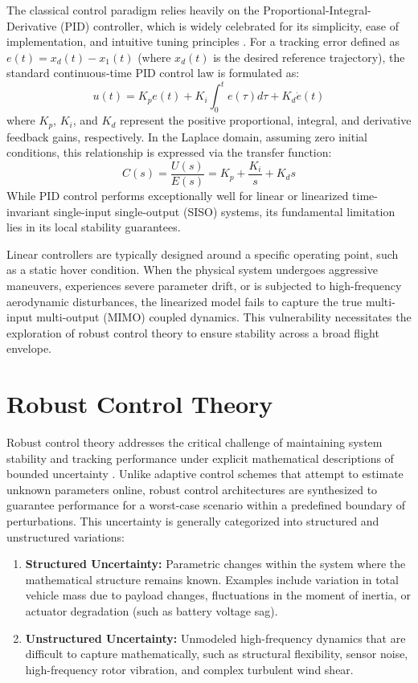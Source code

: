 The classical control paradigm relies heavily on the Proportional-Integral-Derivative (PID) controller, which is widely celebrated for its simplicity, ease of implementation, and intuitive tuning principles \cite{ref_1, ref_28}. For a tracking error defined as $e(t) = x_d(t) - x_1(t)$ (where $x_d(t)$ is the desired reference trajectory), the standard continuous-time PID control law is formulated as:
\begin{equation}
u(t) = K_p e(t) + K_i \int_{0}^{t} e(\tau) d\tau + K_d \dot{e}(t)
\end{equation}
where $K_p$, $K_i$, and $K_d$ represent the positive proportional, integral, and derivative feedback gains, respectively. In the Laplace domain, assuming zero initial conditions, this relationship is expressed via the transfer function:
\begin{equation}
C(s) = \frac{U(s)}{E(s)} = K_p + \frac{K_i}{s} + K_d s
\end{equation}
While PID control performs exceptionally well for linear or linearized time-invariant single-input single-output (SISO) systems, its fundamental limitation lies in its local stability guarantees. 

Linear controllers are typically designed around a specific operating point, such as a static hover condition. When the physical system undergoes aggressive maneuvers, experiences severe parameter drift, or is subjected to high-frequency aerodynamic disturbances, the linearized model fails to capture the true multi-input multi-output (MIMO) coupled dynamics. This vulnerability necessitates the exploration of robust control theory to ensure stability across a broad flight envelope.

\section{Robust Control Theory}
Robust control theory addresses the critical challenge of maintaining system stability and tracking performance under explicit mathematical descriptions of bounded uncertainty \cite{ref_2, ref_29}. Unlike adaptive control schemes that attempt to estimate unknown parameters online, robust control architectures are synthesized to guarantee performance for a worst-case scenario within a predefined boundary of perturbations. This uncertainty is generally categorized into structured and unstructured variations:
\begin{enumerate}
    \item \textbf{Structured Uncertainty:} Parametric changes within the system where the mathematical structure remains known. Examples include variation in total vehicle mass due to payload changes, fluctuations in the moment of inertia, or actuator degradation (such as battery voltage sag).
    \item \textbf{Unstructured Uncertainty:} Unmodeled high-frequency dynamics that are difficult to capture mathematically, such as structural flexibility, sensor noise, high-frequency rotor vibration, and complex turbulent wind shear.
\end{enumerate}

